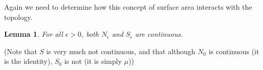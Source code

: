 \documentclass[a4paper,11pt]{article}
\newcommand{\bbR}{\mathbb{R}}
\newtheorem{thm}{Theorem}[section]
\newtheorem{lemma}[thm]{Lemma}
\begin{document}
\begin{comment}
We should check that this new definition of surface area agress with any other
definition of surface area we might encounter in certain cases.  We so so in
the following theorem, which is not required for the remaining results, but
helps to ensure that our effort is worthwhile.

\begin{thm}
\label{thm:smoothSurfaceAreas}
When $K$ is a compact smooth submanifold (with boundary) of $\bbR^m$, $S(K)$
agrees with the standard definition of surface area in terms of the integral
over the boundary manifold of the volume form induced by the Riemannian metric
induced by the ambient metric on $\bbR^m$.
\end{thm}

\begin{proof}
TODO (not much of an idea yet).
\end{proof}
\end{comment}

Again we need to determine how this concept of surface area interacts with
the topology.

\begin{lemma}
\label{thm:surfaceAreaContinuous}
For all $\epsilon>0$, both $N_\epsilon$ and $S_\epsilon$ are continuous.
\end{lemma}

(Note that $S$ is very much not continuous, and that although $N_0$ is
continuous (it is the identity), $S_0$ is not (it is simply $\mu$))
\end{document}

